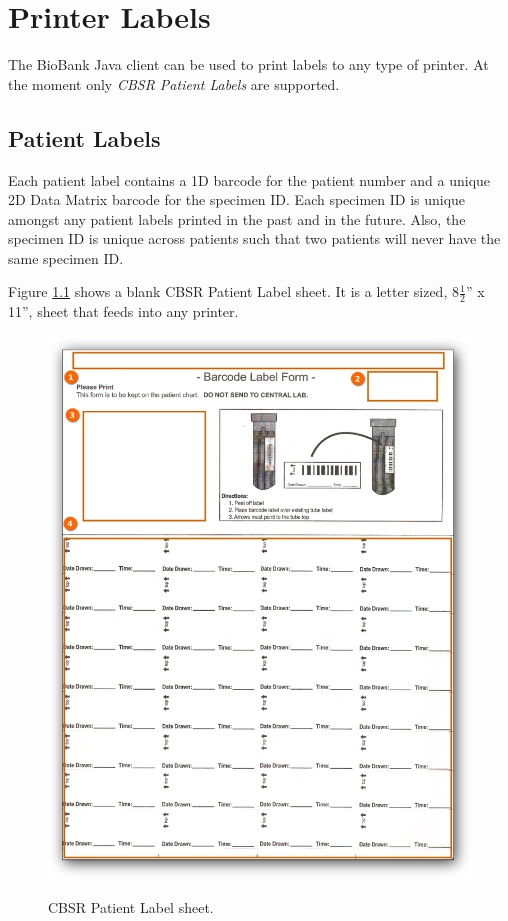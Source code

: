 \chapter{Printer Labels}
\label{chap:printer_labels}

The BioBank Java client can be used to print labels to any type of printer. At
the moment only \emph{CBSR Patient Labels} are supported.

\section{Patient Labels}
\label{sec:printer_labels}

 Each patient label contains a 1D barcode for the patient number and a unique
 2D Data Matrix barcode for the specimen ID. Each specimen ID is unique amongst
 any patient labels printed in the past and in the future. Also, the specimen
 ID is unique across patients such that two patients will never have the
 same specimen ID.

Figure \ref{fig:cbsr_patient_label_sheet} shows a blank CBSR Patient Label
sheet. It is a letter sized, 8$\frac{1}{2}$'' x 11'', sheet that
feeds into any printer.

\begin{figure}[H]
  \centering
  \scalebox{0.35}
	   { \includegraphics*{screenshots/printer_labels/01_cbsr_patient_label_sheet} }
	   \caption{CBSR Patient Label sheet.}
	   \label{fig:cbsr_patient_label_sheet}
\end{figure}

